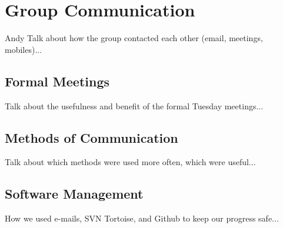 \section{Group Communication}
Andy
Talk about how the group contacted each other (email, meetings, mobiles)...

\subsection{Formal Meetings}
Talk about the usefulness and benefit of the formal Tuesday meetings...

\subsection{Methods of Communication}
Talk about which methods were used more often, which were useful...

\subsection{Software Management}
How we used e-mails, SVN Tortoise, and Github to keep our progress safe...


